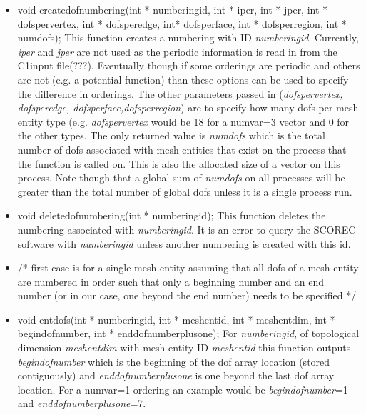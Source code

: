 \begin{itemize}
\item   void createdofnumbering(int * numberingid, int * iper, int * jper,
                           int * dofspervertex, int * dofsperedge, 
                           int* dofsperface, int * dofsperregion, int * numdofs);
 This function creates a numbering with  ID \textit{numberingid}.  Currently, \textit{iper}
and \textit{jper} are not used as the periodic information is read in from the C1input file(???).
Eventually though if some orderings are periodic and others are not (e.g. a potential function)
than these options can be used to specify the difference in orderings. The other parameters
passed in (\textit{dofspervertex, dofsperedge, dofsperface,dofsperregion}) are to specify
how many dofs per mesh entity type (e.g. \textit{dofspervertex} would be 18 for a numvar=3 
vector and 0 for the other types.  The only returned value is \textit{numdofs} 
which is the total number of dofs associated with mesh entities that exist on the process that
the function is called on. This is also the allocated size of a vector on this process.  Note
though that a global sum of \textit{numdofs} on all processes will be greater than the total number
of global dofs unless it is a single process run. 

\item void deletedofnumbering(int * numberingid);
This function deletes the numbering associated with \textit{numberingid}.  It is an error
to query the SCOREC software with \textit{numberingid} unless another numbering is created
with this id.

\item  /* first case is for a single mesh entity assuming that all dofs
     of a mesh entity are numbered in order such that only
     a beginning number and an end number (or in our case, one
     beyond the end number) needs to be specified */
\item  void entdofs(int * numberingid, int * meshentid, int * meshentdim,
               int * begindofnumber, int * enddofnumberplusone);
     For \textit{numberingid}, of topological dimension \textit{meshentdim} with mesh entity
ID \textit{meshentid} this function outputs \textit{begindofnumber} which is the beginning of
the dof array location (stored contiguously) and \textit{enddofnumberplusone} is one
beyond the last dof array location.  For a numvar=1 ordering an example would be \textit{begindofnumber}=1
and \textit{enddofnumberplusone}=7. 


\end{itemize}
